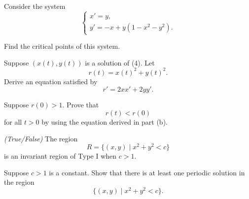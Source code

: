 \begin{problem}
Consider the system
\[
\begin{cases}
x'=y,\\
y'=-x+y(1-x^2-y^2).
\end{cases} \tag{4}
\]
\begin{problemsubparts}
\item Find the critical points of this system.
\item Suppose $(x(t),y(t))$ is a solution of (4). Let
\[
r(t)=x(t)^2+y(t)^2.
\]
Derive an equation satisfied by
\[
r'=2xx'+2yy'.
\]
\item Suppose $r(0)>1$. Prove that
\[
r(t)<r(0)
\]
for all $t>0$ by using the equation derived in part (b).
\item \textit{(True/False)} The region
\[
R=\{(x,y)\mid x^2+y^2<c\}
\]
is an invariant region of Type I when $c>1$.
\item Suppose $c>1$ is a constant. Show that there is at least one periodic solution in the region
\[
\{(x,y)\mid x^2+y^2<c\}.
\]
\end{problemsubparts}
\end{problem}
